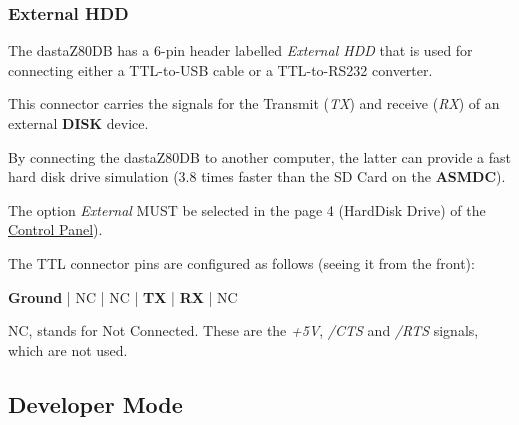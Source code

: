 

        \subsubsection{External HDD}

        The dastaZ80DB has a 6-pin header labelled \textit{External HDD} that is
        used for connecting either a TTL-to-USB cable or a TTL-to-RS232
        converter.

        This connector carries the signals for the Transmit (\textit{TX}) and
        receive (\textit{RX}) of an external \textbf{DISK} device.

        By connecting the dastaZ80DB to another computer, the latter can provide
        a fast hard disk drive simulation (3.8 times faster than the SD Card on
        the \textbf{ASMDC}).

        The option \textit{External} MUST be selected in the page 4 (HardDisk
        Drive) of the \hyperref[subsubsec:controlpanel]{Control Panel}).

        The TTL connector pins are configured as follows (seeing it from the
        front):

        \textbf{Ground} | NC | NC | \textbf{TX} | \textbf{RX} | NC

        NC, stands for Not Connected. These are the \textit{+5V}, \textit{/CTS}
        and \textit{/RTS} signals, which are not used.

    \subsection{Developer Mode}
    \label{subsec:devmode}

